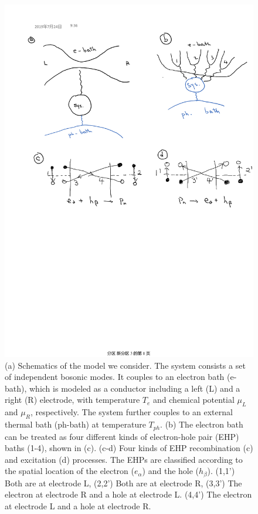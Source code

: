 \documentclass[aps
,twocolumn
,floatfix,footinbib,prl
]{revtex4-1}
\begin{document}
\begin{figure}
	\includegraphics[scale=0.45,angle=0]{schematics-v2.pdf}
	\caption{(a) Schematics of the model we consider. The system consists a set of independent bosonic modes. It couples to an electron bath (e-bath), which is modeled as a conductor including a left (L) and a right (R) electrode, with temperature $T_e$ and chemical potential $\mu_L$ and $\mu_R$, respectively. The system further couples to an external thermal bath (ph-bath) at temperature $T_{ph}$. (b) The electron bath can be treated as four different kinds of electron-hole pair (EHP) baths (1-4), shown in (c). (c-d) Four kinds of EHP recombination (c) and excitation (d) processes. The EHPs are classified according to the spatial location of the electron ($e_\alpha$) and the hole ($h_\beta$). (1,1') Both are at electrode L, (2,2') Both are at electrode R, (3,3') The electron at electrode R and a hole at electrode L. (4,4') The electron at electrode L and a hole at electrode R.}
	\label{fig:ehp}
\end{figure}
\end{document}
